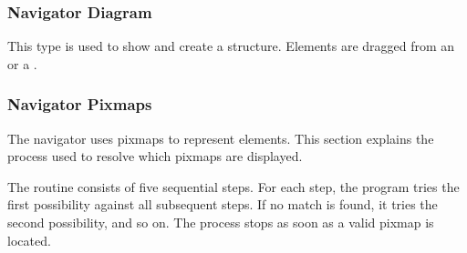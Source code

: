 \subsubsection{Navigator Diagram}
\label{sec:uinavigatorDiagram}

This \NAVIGATOR{} type is used to show and create a structure. Elements are
dragged from an \ICONVIEW{} or a \NAVIGATOR{}.


\newpage
\subsubsection{Navigator Pixmaps}
\label{sec:uinavigatorPixmaps}
The navigator uses pixmaps to represent elements. This section explains the
process used to resolve which pixmaps are displayed.

The routine consists of five sequential steps.
For each step, the program tries the first possibility against all subsequent steps.
If no match is found, it tries the second possibility, and so on.
The process stops as soon as a valid pixmap is located.

